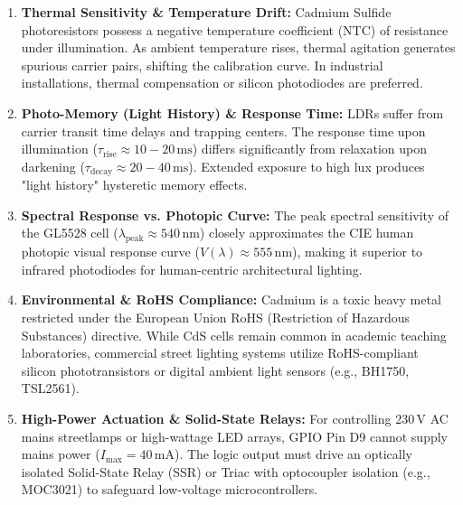 \documentclass[10pt,a4paper]{article}
\begin{document}
\begin{enumerate}[leftmargin=*]
    \item \textbf{Thermal Sensitivity \& Temperature Drift:} Cadmium Sulfide photoresistors possess a negative temperature coefficient (NTC) of resistance under illumination. As ambient temperature rises, thermal agitation generates spurious carrier pairs, shifting the calibration curve. In industrial installations, thermal compensation or silicon photodiodes are preferred.
    \item \textbf{Photo-Memory (Light History) \& Response Time:} LDRs suffer from carrier transit time delays and trapping centers. The response time upon illumination ($\tau_{\text{rise}} \approx 10-20\,\text{ms}$) differs significantly from relaxation upon darkening ($\tau_{\text{decay}} \approx 20-40\,\text{ms}$). Extended exposure to high lux produces "light history" hysteretic memory effects.
    \item \textbf{Spectral Response vs. Photopic Curve:} The peak spectral sensitivity of the GL5528 cell ($\lambda_{\text{peak}} \approx 540\,\text{nm}$) closely approximates the CIE human photopic visual response curve ($V(\lambda) \approx 555\,\text{nm}$), making it superior to infrared photodiodes for human-centric architectural lighting.
    \item \textbf{Environmental \& RoHS Compliance:} Cadmium is a toxic heavy metal restricted under the European Union RoHS (Restriction of Hazardous Substances) directive. While CdS cells remain common in academic teaching laboratories, commercial street lighting systems utilize RoHS-compliant silicon phototransistors or digital ambient light sensors (e.g., BH1750, TSL2561).
    \item \textbf{High-Power Actuation \& Solid-State Relays:} For controlling $230\,\text{V}$ AC mains streetlamps or high-wattage LED arrays, GPIO Pin D9 cannot supply mains power ($I_{\max} = 40\,\text{mA}$). The logic output must drive an optically isolated Solid-State Relay (SSR) or Triac with optocoupler isolation (e.g., MOC3021) to safeguard low-voltage microcontrollers.
\end{enumerate}
\end{document}
